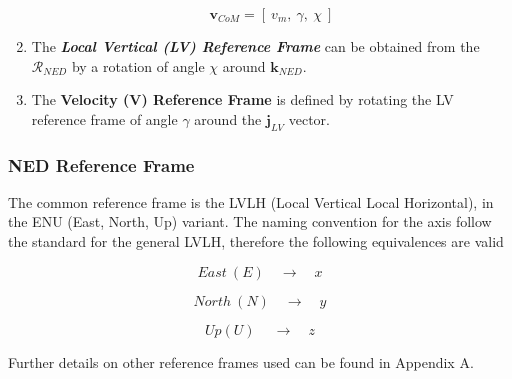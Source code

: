 \begin{enumerate}
         $$
            \textbf{v}_{CoM} = [\: v_{m},\:\gamma,\:\chi \:]
         $$

      \item The \textbf{\textit{Local Vertical (LV) Reference Frame}} can be obtained from
         the $\mathcal{R}_{NED}$ by a rotation of angle $\chi$ around $\textbf{k}_{NED}$.

      \item The \textbf{Velocity (V) Reference Frame} is defined by rotating the LV reference frame
         of angle $\gamma$ around the $\textbf{j}_{LV}$ vector.

   \end{enumerate}

   


\newpage
\subsubsection{NED Reference Frame}

   The common reference frame is the LVLH (Local Vertical Local Horizontal), in the ENU (East, North, Up) variant.
   The naming convention for the axis follow the standard for the general LVLH, therefore the following equivalences are valid

   $$
      East\: (E) \quad\to\quad x
   $$

   $$
      North\: (N) \quad\to\quad y
   $$

   $$
      Up (U)\: \quad\to\quad z
   $$

Further details on other reference frames used can be found in Appendix A.